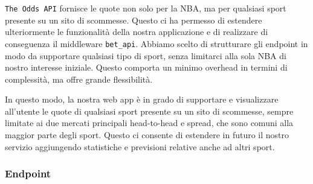\texttt{The Odds API} fornisce le quote non solo per la NBA, ma per qualsiasi sport presente su un sito di scommesse. Questo ci ha permesso di estendere ulteriormente le funzionalità della nostra applicazione e di realizzare di conseguenza il middleware \texttt{bet\_api}. Abbiamo scelto di strutturare gli endpoint in modo da supportare qualsiasi tipo di sport, senza limitarci alla sola NBA di nostro interesse iniziale. Questo comporta un minimo overhead in termini di complessità, ma offre grande flessibilità.

In questo modo, la nostra web app è in grado di supportare e visualizzare all'utente le quote di qualsiasi sport presente su un sito di scommesse, sempre limitate ai due mercati principali head-to-head e spread, che sono comuni alla maggior parte degli sport. Questo ci consente di estendere in futuro il nostro servizio aggiungendo statistiche e previsioni relative anche ad altri sport.

\subsubsection{Endpoint}

